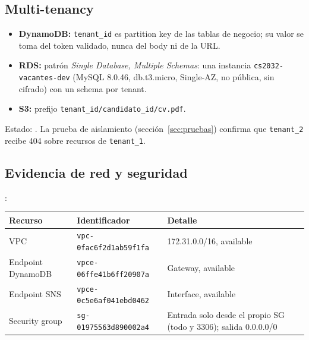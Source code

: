 \subsection{Multi-tenancy}
\begin{itemize}
\item \textbf{DynamoDB:} \texttt{tenant\_id} es partition key de las tablas de negocio; su valor se toma del token validado, nunca del body ni de la URL.
\item \textbf{RDS:} patrón \emph{Single Database, Multiple Schemas}: una instancia \texttt{cs2032-vacantes-dev} (MySQL 8.0.46, db.t3.micro, Single-AZ, no pública, sin cifrado) con un schema por tenant.
\item \textbf{S3:} prefijo \texttt{tenant\_id/candidato\_id/cv.pdf}.
\end{itemize}
Estado: \cumple. La prueba de aislamiento (sección~\ref{sec:pruebas}) confirma que \texttt{tenant\_2} recibe 404 sobre recursos de \texttt{tenant\_1}.

\subsection{Evidencia de red y seguridad}
:
\begin{tabular}{@{}lll@{}}
\toprule
Recurso & Identificador & Detalle \\
\midrule
VPC & \texttt{vpc-0fac6f2d1ab59f1fa} & 172.31.0.0/16, available \\
Endpoint DynamoDB & \texttt{vpce-06ffe41b6ff20907a} & Gateway, available \\
Endpoint SNS & \texttt{vpce-0c5e6af041ebd0462} & Interface, available \\
Security group & \texttt{sg-01975563d890002a4} & Entrada solo desde el propio SG (todo y 3306); salida 0.0.0.0/0 \\
\bottomrule
\end{tabular}
